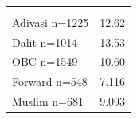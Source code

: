 {
\def\sym#1{\ifmmode^{#1}\else\(^{#1}\)\fi}
\begin{tabular}{l*{1}{c}}
\hline\hline
            &\\
\hline
\hline
Adivasi n=1225&       12.62         \\
Dalit n=1014&       13.53         \\
OBC n=1549  &       10.60         \\
Forward n=548&       7.116         \\
Muslim n=681&       9.093         \\
\hline\hline
\end{tabular}
}
